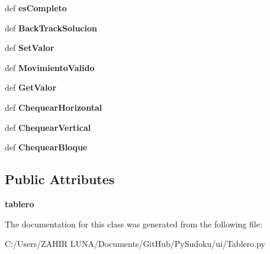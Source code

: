 \begin{DoxyCompactItemize}
\item 
\hypertarget{class_tablero_1_1_generador_a48ea8fae24ab4db4a043a1b914aebc5e}{def {\bfseries es\-Completo}}\label{class_tablero_1_1_generador_a48ea8fae24ab4db4a043a1b914aebc5e}

\item 
\hypertarget{class_tablero_1_1_generador_a12167d65e7046fc6e16de760468f9a22}{def {\bfseries Back\-Track\-Solucion}}\label{class_tablero_1_1_generador_a12167d65e7046fc6e16de760468f9a22}

\item 
\hypertarget{class_tablero_1_1_generador_accab4b0a8ac45fab6070948254a535b4}{def {\bfseries Set\-Valor}}\label{class_tablero_1_1_generador_accab4b0a8ac45fab6070948254a535b4}

\item 
\hypertarget{class_tablero_1_1_generador_af67762e198d584415c3546da78676748}{def {\bfseries Movimiento\-Valido}}\label{class_tablero_1_1_generador_af67762e198d584415c3546da78676748}

\item 
\hypertarget{class_tablero_1_1_generador_abe7c9ee6f2da8dd163b242db8d201813}{def {\bfseries Get\-Valor}}\label{class_tablero_1_1_generador_abe7c9ee6f2da8dd163b242db8d201813}

\item 
\hypertarget{class_tablero_1_1_generador_ab4988a69fb9085aa54d17c2ce51bb459}{def {\bfseries Chequear\-Horizontal}}\label{class_tablero_1_1_generador_ab4988a69fb9085aa54d17c2ce51bb459}

\item 
\hypertarget{class_tablero_1_1_generador_a941cd888165911d2601f97b41dc4be3b}{def {\bfseries Chequear\-Vertical}}\label{class_tablero_1_1_generador_a941cd888165911d2601f97b41dc4be3b}

\item 
\hypertarget{class_tablero_1_1_generador_ae41e3d9b0a5718953ba3b0edb42f2cbf}{def {\bfseries Chequear\-Bloque}}\label{class_tablero_1_1_generador_ae41e3d9b0a5718953ba3b0edb42f2cbf}

\end{DoxyCompactItemize}
\subsection*{Public Attributes}
\begin{DoxyCompactItemize}
\item 
\hypertarget{class_tablero_1_1_generador_a7f684f5faaa38d939ce5e73e6daf689d}{{\bfseries tablero}}\label{class_tablero_1_1_generador_a7f684f5faaa38d939ce5e73e6daf689d}

\end{DoxyCompactItemize}


The documentation for this class was generated from the following file\-:\begin{DoxyCompactItemize}
\item 
C\-:/\-Users/\-Z\-A\-H\-I\-R  L\-U\-N\-A/\-Documents/\-Git\-Hub/\-Py\-Sudoku/ui/Tablero.\-py\end{DoxyCompactItemize}
